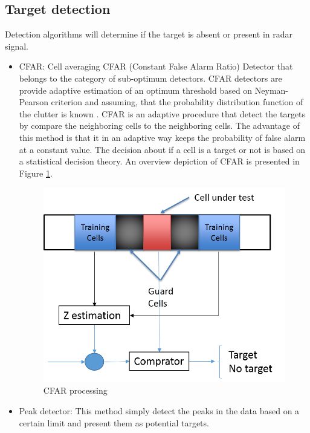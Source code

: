 \subsection{Target detection}
Detection algorithms will determine if the target is absent or present in radar signal.
\begin{itemize}
    \item CFAR: Cell averaging CFAR (Constant False Alarm Ratio) Detector that belongs to the category of sub-optimum detectors. CFAR detectors are provide adaptive estimation of an optimum threshold based on Neyman-Pearson criterion and assuming, that the probability distribution function of the clutter is known \cite{CFAR2010}. CFAR is an adaptive procedure that detect the targets by compare the neighboring cells to the neighboring cells. The advantage of this method is that it in an adaptive way keeps the probability of false alarm at a constant value. The decision about if a cell is a target or not is based on a statistical decision theory. An overview depiction of CFAR is presented in Figure \ref{fig:CFAR}.
        \begin{figure}[t]
            \centering
            \includegraphics[width=\linewidth]{Figures/CFAR.png}
            \caption{CFAR processing}
            \label{fig:CFAR}
        \end{figure}
    \item Peak detector:  This method simply detect the peaks in the data based on a certain limit and present them as potential targets.
\end{itemize}
